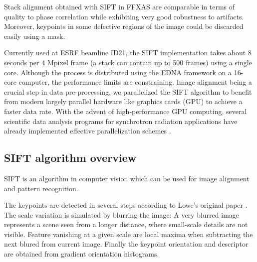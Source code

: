 \documentclass[preprint]{iucr}
\begin{document}
Stack alignment obtained with SIFT in FFXAS are comparable in terms of
quality to phase correlation while exhibiting very good robustness
to artifacts.
Moreover, keypoints in some defective regions of the image could be
discarded easily using a mask.

Currently used at ESRF beamline ID21, the SIFT implementation takes about 8
seconds per 4 Mpixel frame  (a stack can contain up to  500 frames) using
a single core.
Although the process is distributed using the EDNA framework \cite{edna} on a 
16-core computer, the performance limits are constraining.
Image alignment being a crucial step in data pre-processing, we parallelized the
SIFT algorithm to benefit from modern largely parallel
hardware like graphics cards (GPU) to achieve a faster data rate.
With the advent of high-performance GPU computing, several scientific data
analysis programs for synchrotron radiation applications have already
implemented effective parallelization schemes  
\cite{pynx,pyfai,pyhst2}.

\subsection{SIFT algorithm overview}
SIFT is an algorithm in computer vision which can be used for image alignment
and pattern recognition.  



The keypoints are detected in several steps according to Lowe's
original paper \cite{Lowe99}.
The scale variation is simulated by blurring the image:
A very blurred image represents a scene seen from a longer distance, where
small-scale details are not visible. Feature vanishing at a given scale are
local maxima when subtracting the next blured from current image. Finally the
keypoint orientation and descriptor are obtained from gradient orientation
histograms.
\end{document}
